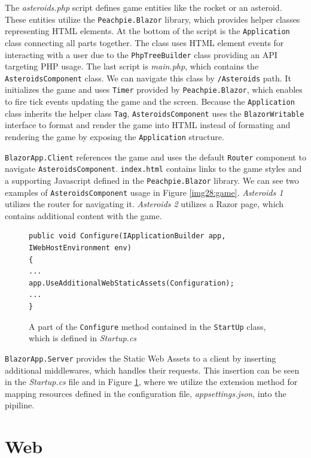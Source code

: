 The \textit{asteroids.php} script defines game entities like the rocket or an asteroid.
These entities utilize the \texttt{Peachpie.Blazor} library, which provides helper classes representing HTML elements.
At the bottom of the script is the \texttt{Application} class connecting all parts together.
The class uses HTML element events for interacting with a user due to the \texttt{PhpTreeBuilder} class providing an API targeting PHP usage.
The last script is \textit{main.php}, which contains the \texttt{AsteroidsComponent} class.
We can navigate this class by \texttt{/Asteroids} path.
It initializes the game and uses \texttt{Timer} provided by \texttt{Peachpie.Blazor}, which enables to fire tick events updating the game and the screen.
Because the \texttt{Application} class inherits the helper class \texttt{Tag}, \texttt{AsteroidsComponent} uses the \texttt{BlazorWritable} interface to format and render the game into HTML instead of formating and rendering the game by exposing the \texttt{Application} structure.
\par
\texttt{BlazorApp.Client} references the game and uses the default \texttt{Router} component to navigate \texttt{AsteroidsComponent}.
\texttt{index.html} contains links to the game styles and a supporting Javascript defined in the \texttt{Peachpie.Blazor} library.
We can see two examples of \texttt{AsteroidsComponent} usage in Figure \ref{img28:game}.
\textit{Asteroids 1} utilizes the router for navigating it.
\textit{Asteroids 2} utilizes a Razor page, which contains additional content with the game.
\par
\begin{figure}
\begin{lstlisting}
public void Configure(IApplicationBuilder app, 
IWebHostEnvironment env)
{
...
app.UseAdditionalWebStaticAssets(Configuration);
...
}
\end{lstlisting}
\caption{A part of the \texttt{Configure} method contained in the \texttt{StartUp} class, which is defined in \textit{Startup.cs}}
\label{img21:server}
\end{figure}
\par
\texttt{BlazorApp.Server} provides the Static Web Assets to a client by inserting additional middlewares, which handles their requests.
This insertion can be seen in the \textit{Startup.cs} file and in Figure \ref{img21:server}, where we utilize the extension method for mapping resources defined in the configuration file, \textit{appsettings.json}, into the pipiline.

\section{Web}

